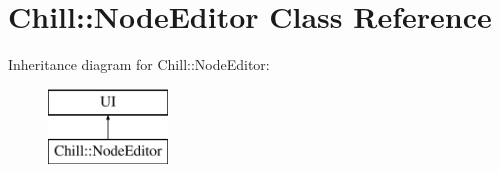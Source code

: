 \hypertarget{class_chill_1_1_node_editor}{}\section{Chill\+:\+:Node\+Editor Class Reference}
\label{class_chill_1_1_node_editor}
Inheritance diagram for Chill\+:\+:Node\+Editor\+:\begin{figure}[H]
\begin{center}
\leavevmode
\includegraphics[height=2.000000cm]{class_chill_1_1_node_editor}
\end{center}
\end{figure}
